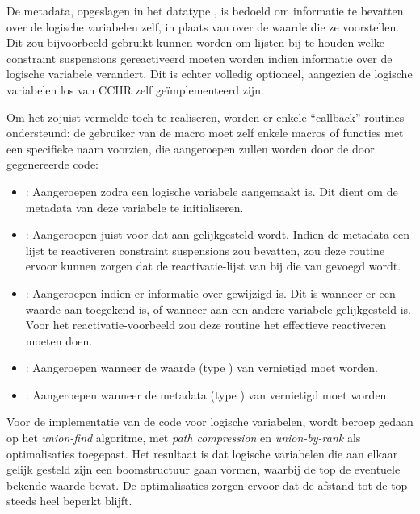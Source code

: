 De metadata, opgeslagen in het datatype , is bedoeld om informatie te bevatten over de logische variabelen zelf, in plaats van over de waarde die ze voorstellen. Dit zou bijvoorbeeld gebruikt kunnen worden om lijsten bij te houden welke constraint suspensions gereactiveerd moeten worden indien informatie over de logische variabele verandert. Dit is echter volledig optioneel, aangezien de logische variabelen los van CCHR zelf ge\"implementeerd zijn.

Om het zojuist vermelde toch te realiseren, worden er enkele ``callback'' routines ondersteund: de gebruiker van de  macro moet zelf enkele macros of functies met een specifieke naam voorzien, die aangeroepen zullen worden door de door  gegenereerde code: \begin{itemize}
  \item {}: Aangeroepen zodra een logische variabele  aangemaakt is. Dit dient om de metadata van deze variabele te initialiseren.
  \item {}: Aangeroepen juist voor dat  aan  gelijkgesteld wordt. Indien de metadata een lijst te reactiveren constraint suspensions zou bevatten, zou deze routine ervoor kunnen zorgen dat de reactivatie-lijst van  bij die van  gevoegd wordt.
  \item {}: Aangeroepen indien er informatie over  gewijzigd is. Dit is wanneer er een waarde aan toegekend is, of wanneer  aan een andere variabele gelijkgesteld is. Voor het reactivatie-voorbeeld zou deze routine het effectieve reactiveren moeten doen.
  \item {}: Aangeroepen wanneer de waarde (type ) van  vernietigd moet worden.
  \item {}: Aangeroepen wanneer de metadata (type ) van  vernietigd moet worden.
\end{itemize}

Voor de implementatie van de code voor logische variabelen, wordt beroep gedaan op het {\em union-find} algoritme, met {\em path compression} en {\em union-by-rank} als optimalisaties toegepast. Het resultaat is dat logische variabelen die aan elkaar gelijk gesteld zijn een boomstructuur gaan vormen, waarbij de top de eventuele bekende waarde bevat. De optimalisaties zorgen ervoor dat de afstand tot de top steeds heel beperkt blijft.

